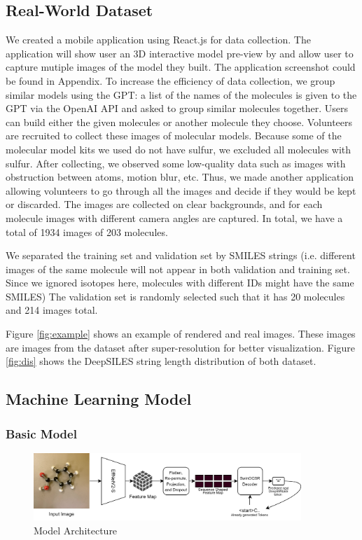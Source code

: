 \documentclass[12pt]{article}
\begin{document}
\subsection{Real-World Dataset}
We created a mobile application using React.js for data collection. The application will show user an 3D interactive model pre-view by \autocite{rego_3dmoljs_2015} and allow user to capture mutiple images of the model they built. The application screenshot could be found in Appendix. To increase the efficiency of data collection, we group similar models using the GPT: a list of the names of the molecules is given to the GPT via the OpenAI API and asked to group similar molecules together. Users can build either the given molecules or another molecule they choose. Volunteers are recruited to collect these images of molecular models. Because some of the molecular model kits we used do not have sulfur, we excluded all molecules with sulfur. After collecting, we observed some low-quality data such as images with obstruction between atoms, motion blur, etc. Thus, we made another application allowing volunteers to go through all the images and decide if they would be kept or discarded. The images are collected on clear backgrounds, and for each molecule images with different camera angles are captured. In total, we have a total of 1934 images of 203 molecules. 

We separated the training set and validation set by SMILES strings (i.e. different images of the same molecule will not appear in both validation and training set. Since we ignored isotopes here, molecules with different IDs might have the same SMILES) The validation set is randomly selected such that it has 20 molecules and 214 images total. 

Figure \ref{fig:example} shows an example of rendered and real images. These images are images from the dataset after super-resolution for better visualization. Figure \ref{fig:dis} shows the DeepSILES string length distribution of both dataset. 

\subsection{Machine Learning Model} 
\subsubsection{Basic Model}
\begin{figure}
    \centering
    \includegraphics[width=0.9\textwidth]{arch}
    \caption{Model Architecture}
    \label{fig:arch}
\end{figure}
\end{document}
